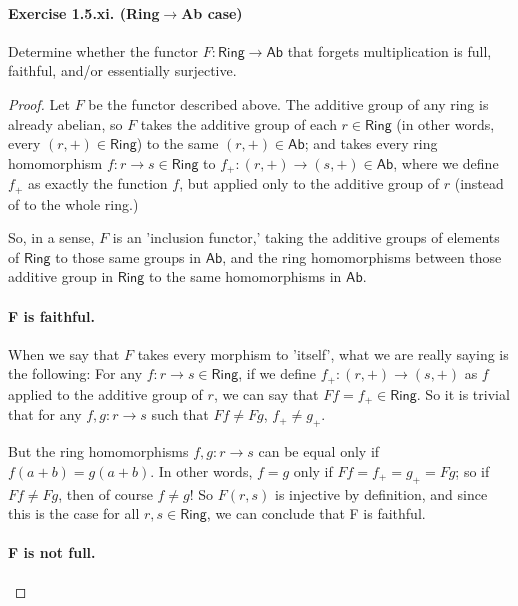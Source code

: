 \documentclass[main.tex]{subfiles}
\begin{document}
\paragraph{Exercise 1.5.xi. (Ring$ \to $Ab case)} Determine whether the functor
\(F \colon \textsf{Ring} \to \textsf{Ab}\) that forgets multiplication is full,
faithful, and/or essentially surjective.

\begin{proof}
	Let \(F\) be the functor described above. The additive group of any ring is
	already abelian, so \(F\)  takes the additive group of each \(r \in
	\textsf{Ring}\) (in other words, every \((r, +) \in \textsf{Ring}\)) to the
	same \((r, +) \in \textsf{Ab}\); and takes every ring homomorphism \(f
	\colon r \to s \in \textsf{Ring}\) to \(f_+ \colon (r, +) \to (s, +) \in
	\textsf{Ab}\),  where we define \(f_+\) as exactly the function \(f\), but
	applied only to the additive group of \(r\) (instead of to the whole ring.)

	So, in a sense, \(F\) is an 'inclusion functor,' taking the additive groups of
	elements of \(\textsf{Ring}\) to those same groups in \(\textsf{Ab}\), and the
	ring homomorphisms between those additive group in \(\textsf{Ring}\) to the same
	homomorphisms in \(\textsf{Ab}\).

	\paragraph{F is faithful.}

	When we say that \(F\) takes every morphism to 'itself', what we are really
	saying is the following: For any \(f \colon r \to s \in \textsf{Ring}\), if
	we define \(f_+ \colon (r, +) \to (s, +)\) as \(f\) applied to the additive
	group of \(r\), we can say that \(Ff = f_+\in \textsf{Ring}\). So it is
	trivial that for any \(f, g \colon r \to s\) such that \(Ff \neq Fg\), \(f_+
	\neq g_+\).

	But the ring homomorphisms \(f, g \colon r \to s\) can be equal only if
	\(f(a+b) = g(a+b)\). In other words, \(f = g \) only if \(Ff = f_+ = g_+ =
	Fg\); so if \(Ff \neq Fg\), then of course \(f \neq g \)! So \(F(r, s)\) is
	injective by definition, and since this is the case for all \(r, s \in
	\textsf{Ring}\), we can conclude that F is faithful.

	\paragraph{F is not full.}


\end{proof}
\end{document}
